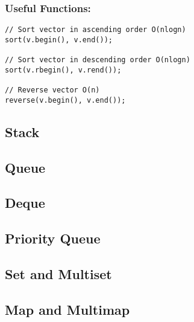 \documentclass{article}
\begin{document}
\subsubsection{Useful Functions:}
\begin{verbatim}
// Sort vector in ascending order O(nlogn)
sort(v.begin(), v.end());

// Sort vector in descending order O(nlogn)
sort(v.rbegin(), v.rend());

// Reverse vector O(n)
reverse(v.begin(), v.end());
\end{verbatim}

\subsection{Stack}
\subsection{Queue}
\subsection{Deque}
\subsection{Priority Queue}
\subsection{Set and Multiset}
\subsection{Map and Multimap}
\end{document}

